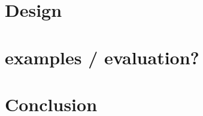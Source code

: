 \documentclass[conference]{IEEEtran}
\begin{document}


\section{Design}



\section{examples / evaluation?}



\section{Conclusion}





\end{document}
